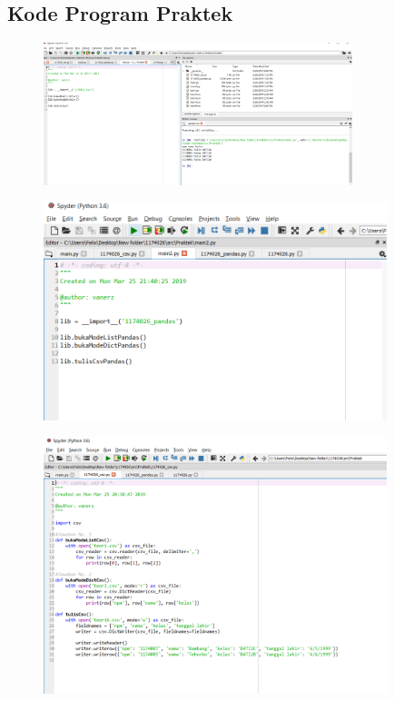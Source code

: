 \subsection{Kode Program Praktek}
\begin{figure}[H]
	\includegraphics[width=9cm]{figures/4/1174026/Praktek/k1.png}
	\centering
\end{figure}
\begin{figure}[H]
	\includegraphics[width=10cm]{figures/4/1174026/Praktek/k2.png}
	\centering
\end{figure}
\begin{figure}[H]
	\includegraphics[width=10cm]{figures/4/1174026/Praktek/k3.png}
	\centering
\end{figure}
